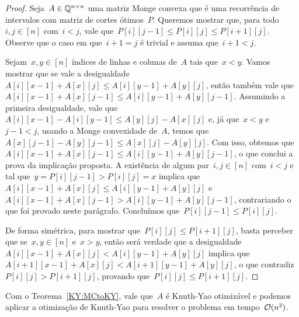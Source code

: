 \begin{proof}
Seja~$A \in \mathbb{Q}^{n \times n}$ uma matriz Monge convexa que é uma recorrência de intervalos com matriz de cortes ótimos~$P$. Queremos mostrar que, para todo~$i,j \in [n]$ com~$i < j$, vale que~${P[i][j-1] \leq P[i][j] \leq P[i+1][j]}$. Observe que o caso em que~${i + 1 = j}$ é trivial e assuma que~${i + 1 < j}$.

Sejam~${x,y \in[n]}$ índices de linhas e colunas de~$A$ tais que~$x < y$. Vamos mostrar que se vale a desigualdade~${A[i][x-1] + A[x][j] \leq A[i][y-1] + A[y][j]}$, então também vale que~${A[i][x-1] + A[x][j-1] \leq A[i][y-1] + A[y][j-1]}$. Assumindo a primeira desigualdade, vale que~${A[i][x-1] - A[i][y-1] \leq A[y][j] - A[x][j]}$ e, já que~${x < y}$ e~${j-1 < j}$, usando a Monge convexidade de~$A$, temos que~${A[x][j-1] - A[y][j-1] \leq A[x][j] - A[y][j]}$. Com isso, obtemos que~${A[i][x-1] + A[x][j-1] \leq A[i][y-1] + A[y][j-1]}$, o que conclui a prova da implicação proposta. A existência de algum par~$i,j \in [n]$ com~$i < j$ e tal que~${y = P[i][j-1] > P[i][j] = x}$ implica que~${A[i][x-1] + A[x][j] \leq A[i][y-1] + A[y][j]}$ e~${A[i][x-1] + A[x][j-1] > A[i][y-1] + A[y][j-1]}$, contrariando o que foi provado neste parágrafo. Concluímos que~${P[i][j-1] \leq P[i][j]}$. 

De forma simétrica, para mostrar que~${P[i][j] \leq P[i+1][j]}$, basta perceber que se~${x,y \in [n]}$ e~${x > y}$, então será verdade que a desigualdade~${A[i][x-1] + A[x][j] < A[i][y-1] + A[y][j]}$ implica que~${A[i+1][x-1] + A[x][j] < A[i+1][y-1] + A[y][j]}$, o que contradiz~${P[i][j] > P[i+1][j]}$, provando que~${P[i][j] \leq P[i+1][j]}$.
\end{proof}

Com o Teorema~\ref{KY:MCtoKY}, vale que~$A$ é Knuth-Yao otimizável e podemos aplicar a otimização de Knuth-Yao para resolver o problema em tempo~$\mathcal{O}(n^2)$.
